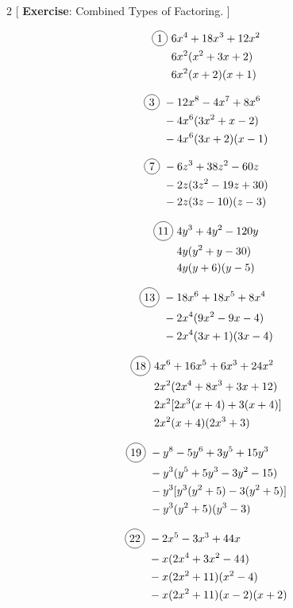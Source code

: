 \begin{multicols}{2}
[
  \textbf{Exercise}: Combined Types of Factoring.
]

\begin{align*}
  \circled{1}\ &6x^{4}+18x^{3}+12x^{2}\\
  &6x^{2}(x^{2}+3x+2)\\
  &6x^{2}(x+2)(x+1)
\end{align*}

\begin{align*}
  \circled{3}\ &-12x^{8}-4x^{7}+8x^{6}\\
  &-4x^{6}(3x^{2}+x-2)\\
  &-4x^{6}(3x+2)(x-1)
\end{align*}

\begin{align*}
  \circled{7}\ &-6z^{3}+38z^{2}-60z\\
  &-2z(3z^{2}-19z+30)\\
  &-2z(3z-10)(z-3)
\end{align*}

\begin{align*}
  \circled{11}\ &4y^{3}+4y^{2}-120y\\
  &4y(y^{2}+y-30)\\
  &4y(y+6)(y-5)
\end{align*}

\begin{align*}
  \circled{13}\ &-18x^{6}+18x^{5}+8x^{4}\\
  &-2x^{4}(9x^{2}-9x-4)\\
  &-2x^{4}(3x+1)(3x-4)
\end{align*}

\begin{align*}
  \circled{18}\ &4x^{6}+16x^{5}+6x^{3}+24x^{2}\\
  &2x^{2}(2x^{4}+8x^{3}+3x+12)\\
  &2x^{2}[2x^{3}(x+4)+3(x+4)]\\
  &2x^{2}(x+4)(2x^{3}+3)\
\end{align*}

\begin{align*}
  \circled{19}\ &-y^{8}-5y^{6}+3y^{5}+15y^{3}\\
  &-y^{3}(y^{5}+5y^{3}-3y^{2}-15)\\
  &-y^{3}[y^{3}(y^{2}+5)-3(y^{2}+5)]\\
  &-y^{3}(y^{2}+5)(y^{3}-3)\
\end{align*}

\begin{align*}
  \circled{22}\ &-2x^{5}-3x^{3}+44x\\
  &-x(2x^{4}+3x^{2}-44)\\
  &-x(2x^{2}+11)(x^{2}-4)\\
  &-x(2x^{2}+11)(x-2)(x+2)
\end{align*}


\end{multicols}
